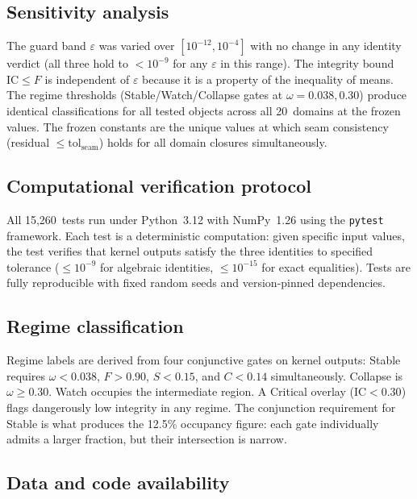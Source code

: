 \documentclass[11pt]{article}
\newcommand{\eps}{\varepsilon}
\newcommand{\IC}{\mathrm{IC}}
\begin{document}
\subsection{Sensitivity analysis}

The guard band $\eps$ was varied over $[10^{-12}, 10^{-4}]$ with
no change in any identity verdict (all three hold to
$< 10^{-9}$ for any $\eps$ in this range). The integrity bound
$\IC \leq F$ is independent of $\eps$ because it is a property of
the inequality of means. The regime thresholds (Stable/Watch/Collapse
gates at $\omega = 0.038, 0.30$) produce identical classifications
for all tested objects across all 20~domains at the frozen values.
The frozen constants are the unique values at which seam consistency
(residual $\leq \mathrm{tol}_{\mathrm{seam}}$) holds for all domain
closures simultaneously.

\subsection{Computational verification protocol}

All 15{,}260~tests run under Python~3.12 with NumPy~1.26 using
the \texttt{pytest} framework. Each test is a deterministic
computation: given specific input values, the test verifies that
kernel outputs satisfy the three identities to specified tolerance
($\leq 10^{-9}$ for algebraic identities, $\leq 10^{-15}$ for
exact equalities). Tests are fully reproducible with fixed random
seeds and version-pinned dependencies.

\subsection{Regime classification}

Regime labels are derived from four conjunctive gates on kernel
outputs: Stable requires $\omega < 0.038$, $F > 0.90$, $S < 0.15$,
and $C < 0.14$ simultaneously. Collapse is $\omega \geq 0.30$.
Watch occupies the intermediate region. A Critical overlay
($\IC < 0.30$) flags dangerously low integrity in any regime.
The conjunction requirement for Stable is what produces the 12.5\%
occupancy figure: each gate individually admits a larger fraction,
but their intersection is narrow.

\subsection{Data and code availability}
\end{document}
